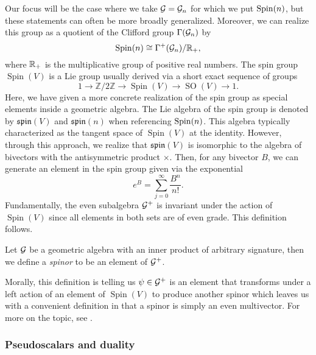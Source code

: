 Our focus will be the case where we take $\mathcal{G}=\mathcal{G}_n$ for which we put $\operatorname{Spin}(n)$, but these statements can often be more broadly generalized. Moreover, we can realize this group as a quotient of the Clifford group $\Gamma(\mathcal{G}_n)$ by
\begin{equation}
\operatorname{Spin}(n) \cong \Gamma^+(\mathcal{G}_n)/\mathbb{R}_+,
\end{equation}
where $\mathbb{R}_+$ is the multiplicative group of positive real numbers. The spin group $\operatorname{Spin}(V)$ is a Lie group usually derived via a short exact sequence of groups
\begin{equation}
1 \to \mathbb{Z}/2\mathbb{Z} \to \operatorname{Spin}(V) \to \operatorname{SO}(V) \to 1.
\end{equation}
Here, we have given a more concrete realization of the spin group as special elements inside a geometric algebra. The Lie algebra of the spin group is denoted by $\mathfrak{spin}(V)$ and $\mathfrak{spin}(n)$ when referencing $\operatorname{Spin}(n)$. This algebra typically characterized as the tangent space of $\operatorname{Spin}(V)$ at the identity. However, through this approach, we realize that $\mathfrak{spin}(V)$ is isomorphic to the algebra of bivectors with the antisymmetric product $\times$.  Then, for any bivector $B$, we can generate an element in the spin group given via the exponential
\begin{equation}
e^{B} = \sum_{j=0}^\infty \frac{B^n}{n!}.
\end{equation}
Fundamentally, the even subalgebra $\mathcal{G}^+$ is invariant under the action of $\operatorname{Spin}(V)$ since all elements in both sets are of even grade. This definition follows.
\begin{definition}
Let $\mathcal{G}$ be a geometric algebra with an inner product of arbitrary signature, then we define a \emph{spinor} to be an element of $\mathcal{G}^+$.
\end{definition}
Morally, this definition is telling us $\psi \in \mathcal{G}^+$ is an element that transforms under a left action of an element of $\operatorname{Spin}(V)$ to produce another spinor which leaves us with a convenient definition in that a spinor is simply an even multivector. For more on the topic, see \cite{janssens_special_nodate}.

\subsubsection{Pseudoscalars and duality}
\label{subsubsec:duality_and_pseudoscalars}

